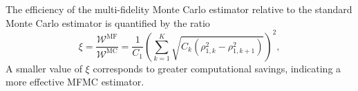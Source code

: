 The efficiency of the multi-fidelity Monte Carlo estimator relative to the standard Monte Carlo estimator is quantified by the ratio
%
\begin{equation}\label{eq:MFMC_sampling_cost_efficiency}
    \xi = \frac{\mathcal{W}^\text{MF}}{\mathcal{W}^\text{MC}} = \frac{1}{C_1} \left(\sum_{k=1}^K\sqrt{C_k\left(\rho_{1,k}^2 - \rho_{1,k+1}^2\right)}\right)^2,
\end{equation}
%
A smaller value of $\xi$ corresponds to greater computational savings, indicating a more effective MFMC estimator.






